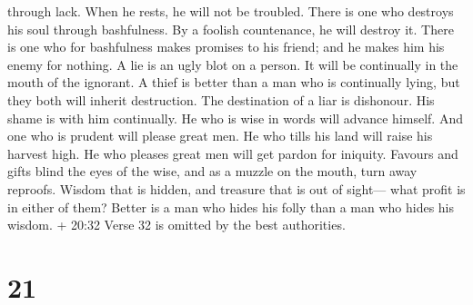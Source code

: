 through lack. When he rests, he will not be troubled. 
There is one who destroys his soul through bashfulness. By a foolish
countenance, he will destroy it.  There is one who for
bashfulness makes promises to his friend; and he makes him his enemy for
nothing.  A lie is an ugly blot on a person. It will be
continually in the mouth of the ignorant.  A thief is
better than a man who is continually lying, but they both will inherit
destruction.  The destination of a liar is dishonour. His
shame is with him continually.  He who is wise in words
will advance himself. And one who is prudent will please great men.
 He who tills his land will raise his harvest high. He who
pleases great men will get pardon for iniquity.  Favours
and gifts blind the eyes of the wise, and as a muzzle on the mouth, turn
away reproofs.  Wisdom that is hidden, and treasure that is
out of sight--- what profit is in either of them?  Better
is a man who hides his folly than a man who hides his wisdom.
 + 20:32 Verse 32 is omitted by the best authorities.

\hypertarget{section-17}{%
\section{21}\label{section-17}}

